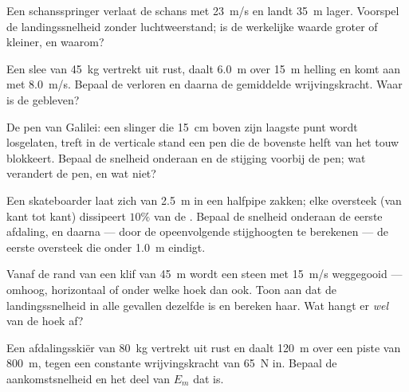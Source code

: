 \begin{exercise}[$\star\star$]\label{exo:g11:mechanical-energy:9}
Een schansspringer verlaat de schans met \qty{23}{m/s} en landt
\qty{35}{m} lager. Voorspel de landingssnelheid zonder luchtweerstand; is
de werkelijke waarde groter of kleiner, en waarom?
\end{exercise}

\begin{exercise}[$\star\star$]\label{exo:g11:mechanical-energy:10}
Een slee van \qty{45}{kg} vertrekt uit rust, daalt \qty{6.0}{m} over
\qty{15}{m} helling en komt aan met \qty{8.0}{m/s}. Bepaal de verloren
 en daarna de gemiddelde wrijvingskracht. Waar is de
 gebleven?
\end{exercise}

\begin{exercise}[$\star\star$]\label{exo:g11:mechanical-energy:11}
De pen van Galilei: een slinger die \qty{15}{cm} boven zijn laagste punt
wordt losgelaten, treft in de verticale stand een pen die de bovenste
helft van het touw blokkeert. Bepaal de snelheid onderaan en de stijging
voorbij de pen; wat verandert de pen, en wat niet?
\end{exercise}

\begin{exercise}[$\star\star\star$]\label{exo:g11:mechanical-energy:12}
Een skateboarder laat zich van \qty{2.5}{m} in een halfpipe zakken; elke
oversteek (van kant tot kant) dissipeert $10\%$ van de . Bepaal de snelheid onderaan de eerste afdaling, en daarna ---
door de opeenvolgende stijghoogten te berekenen --- de eerste oversteek
die onder \qty{1.0}{m} eindigt.
\end{exercise}

\begin{exercise}[$\star\star\star$]\label{exo:g11:mechanical-energy:13}
Vanaf de rand van een klif van \qty{45}{m} wordt een steen met
\qty{15}{m/s} weggegooid --- omhoog, horizontaal of onder welke hoek dan
ook. Toon aan dat de landingssnelheid in alle gevallen dezelfde is en
bereken haar. Wat hangt er \emph{wel} van de hoek af?
\end{exercise}

\begin{exercise}[$\star\star\star$]\label{exo:g11:mechanical-energy:14}
Een afdalingsskiër van \qty{80}{kg} vertrekt uit rust en daalt
\qty{120}{m} over een piste van \qty{800}{m}, tegen een constante
wrijvingskracht van \qty{65}{N} in. Bepaal de aankomstsnelheid en het
deel van $E_m$ dat  is.
\end{exercise}

